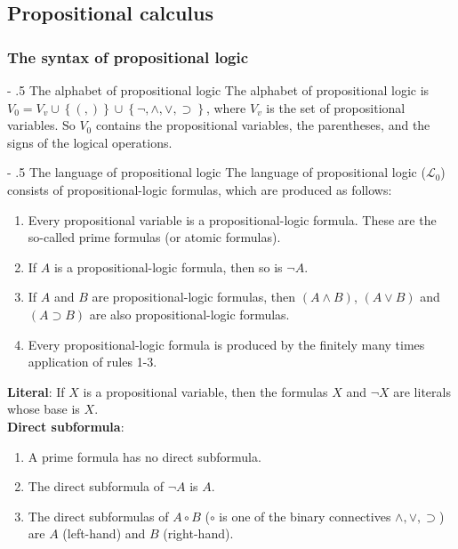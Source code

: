\documentclass[margin=0px]{article}
\makeatletter
\renewcommand\paragraph{%
	\@startsection{paragraph}{4}{0mm}%
	{-\baselineskip}%
	{.5\baselineskip}%
	{\normalfont\normalsize\bfseries}}
\makeatother
\begin{document}
\subsection{Propositional calculus}

\subsubsection{The syntax of propositional logic}

\paragraph{The alphabet of propositional logic}
The alphabet of propositional logic is $V_{0}=V_{v} \cup \left\{(,)\right\} \cup \left\{\neg, \wedge, \vee, \supset\right\}$, where $V_{v}$ is the
set of propositional variables. So $V_{0}$ contains the propositional variables, the parentheses, and the signs of the logical operations.

\paragraph{The language of propositional logic}
The language of propositional logic ($\mathcal{L}_{0}$) consists of propositional-logic formulas, which are produced as follows:
\begin{enumerate}
    \item	Every propositional variable is a propositional-logic formula. These are the so-called prime formulas (or atomic formulas).

    \item	If $A$ is a propositional-logic formula, then so is $\neg A$.

    \item	If $A$ and $B$ are propositional-logic formulas, then $(A \wedge B)$, $(A \vee B)$ and $(A \supset B)$ are also
          propositional-logic formulas.

    \item	Every propositional-logic formula is produced by the finitely many times application of rules 1-3.
\end{enumerate}

\noindent \textbf{Literal}: If $X$ is a propositional variable, then the formulas $X$ and $\neg X$ are literals whose base is $X$.\\

\noindent \textbf{Direct subformula}:
\begin{enumerate}
    \item	A prime formula has no direct subformula.

    \item	The direct subformula of $\neg A$ is $A$.

    \item	The direct subformulas of $A \circ B$ ($\circ$ is one of the binary connectives $\wedge, \vee, \supset$) are $A$ (left-hand)
          and $B$ (right-hand).
\end{enumerate}
\end{document}
